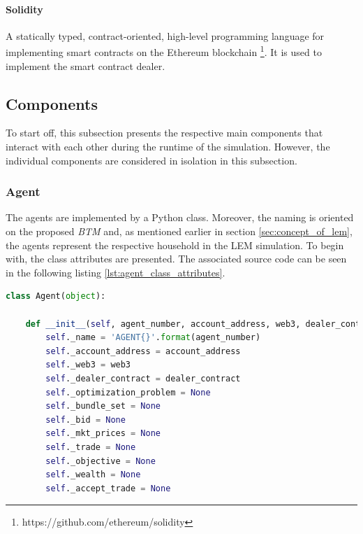 \paragraph{Solidity}
A statically typed, contract-oriented, high-level programming language for implementing smart contracts on the Ethereum
blockchain \footnote{https://github.com/ethereum/solidity}.
It is used to implement the smart contract dealer. 

\clearpage
\subsection{Components}
\label{sec:components_of_simulation}
To start off, this subsection presents the respective main components 
that interact with each other during the runtime of the simulation.
However, the individual components are considered in isolation in this subsection.

\subsubsection{Agent}
\label{sec:agent_class}
The agents are implemented by a Python class. Moreover, the naming is oriented on the proposed \textit{BTM} and,
as mentioned earlier in section \ref{sec:concept_of_lem}, the agents represent the respective household 
in the LEM simulation.
To begin with, the class attributes are presented. 
The associated source code can be seen in the following listing \ref{lst:agent_class_attributes}.

\begin{lstlisting}[label=lst:agent_class_attributes, caption=Overview of the agent class attributes, language=Python]
    class Agent(object):

    def __init__(self, agent_number, account_address, web3, dealer_contract):
        self._name = 'AGENT{}'.format(agent_number)
        self._account_address = account_address
        self._web3 = web3
        self._dealer_contract = dealer_contract
        self._optimization_problem = None
        self._bundle_set = None
        self._bid = None
        self._mkt_prices = None
        self._trade = None
        self._objective = None
        self._wealth = None
        self._accept_trade = None
\end{lstlisting}

